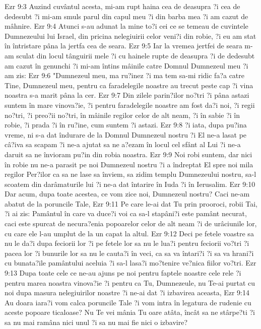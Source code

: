 Ezr 9:3  Auzind cuvântul acesta, mi-am rupt haina cea de deasupra ?i cea de dedesubt ?i mi-am smuls parul din capul meu ?i din barba mea ?i am cazut de mâhnire.
Ezr 9:4  Atunci s-au adunat la mine to?i cei ce se temeau de cuvintele Dumnezeului lui Israel, din pricina nelegiuirii celor veni?i din robie, ?i eu am stat în întristare pâna la jertfa cea de seara.
Ezr 9:5  Iar la vremea jertfei de seara m-am sculat din locul tânguirii mele ?i cu hainele rupte de deasupra ?i de dedesubt am cazut în genunchi ?i mi-am întins mâinile catre Domnul Dumnezeul meu ?i am zis:
Ezr 9:6  "Dumnezeul meu, ma ru?inez ?i ma tem sa-mi ridic fa?a catre Tine, Dumnezeul meu, pentru ca faradelegile noastre au trecut peste cap ?i vina noastra s-a marit pâna la cer.
Ezr 9:7  Din zilele parin?ilor no?tri ?i pâna astazi suntem în mare vinova?ie, ?i pentru faradelegile noastre am fost da?i noi, ?i regii no?tri, ?i preo?ii no?tri, în mâinile regilor celor de alt neam, ?i în sabie ?i în robie, ?i prada ?i în ru?ine, cum suntem ?i astazi.
Ezr 9:8  ?i iata, dupa pu?ina vreme, ni s-a dat îndurare de la Domnul Dumnezeul nostru ?i El ne-a lasat pe câ?iva sa scapam ?i ne-a ajutat sa ne a?ezam în locul cel sfânt al Lui ?i ne-a daruit sa ne învioram pu?in din robia noastra.
Ezr 9:9  Noi robi suntem, dar nici în robie nu ne-a parasit pe noi Dumnezeul nostru ?i a îndreptat El spre noi mila regilor Per?ilor ca sa ne lase sa înviem, sa zidim templu Dumnezeului nostru, sa-l scoatem din darâmaturile lui ?i ne-a dat întarire în Iuda ?i în Ierusalim.
Ezr 9:10  Dar acum, dupa toate acestea, ce vom zice noi, Dumnezeul nostru? Caci ne-am abatut de la poruncile Tale,
Ezr 9:11  Pe care le-ai dat Tu prin prooroci, robii Tai, ?i ai zis: Pamântul în care va duce?i voi ca sa-l stapâni?i este pamânt necurat, caci este spurcat de necura?enia popoarelor celor de alt neam ?i de urâciunile lor, cu care ele l-au umplut de la un capat la altul.
Ezr 9:12  Deci pe fetele voastre sa nu le da?i dupa feciorii lor ?i pe fetele lor sa nu le lua?i pentru feciorii vo?tri ?i pacea lor ?i bunurile lor sa nu le cauta?i în veci, ca sa va întari?i ?i sa va hrani?i cu bunata?ile pamântului aceluia ?i sa-l lasa?i mo?tenire ve?nica fiilor vo?tri.
Ezr 9:13  Dupa toate cele ce ne-au ajuns pe noi pentru faptele noastre cele rele ?i pentru marea noastra vinova?ie ?i pentru ca Tu, Dumnezeule, nu Te-ai purtat cu noi dupa masura nelegiuirilor noastre ?i ne-ai dat ?i izbavirea aceasta,
Ezr 9:14  Au doara iara?i vom calca poruncile Tale ?i vom intra în legatura de rudenie cu aceste popoare ticaloase? Nu Te vei mânia Tu oare atâta, încât sa ne stârpe?ti ?i sa nu mai ramâna nici unul ?i sa nu mai fie nici o izbavire?

